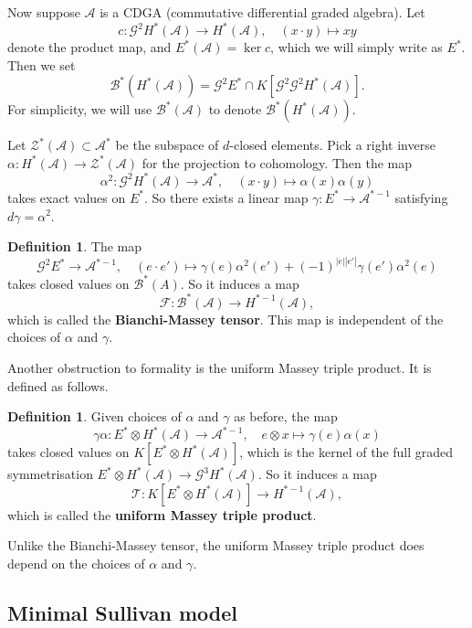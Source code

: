 \documentclass{article}
\theoremstyle{plain}
\theoremstyle{definition}
\newtheorem{defn}[thm]{Definition}
\theoremstyle{plain}
\numberwithin{equation}{section}
\begin{document}
Now suppose $\mathcal{A}$ is a CDGA (commutative differential graded algebra). Let
$$
c:\mathcal{G}^2H^*(\mathcal{A})\to H^*(\mathcal{A}), \quad (x\cdot y)\mapsto xy
$$
denote the product map, and $E^*(\mathcal{A})=\ker c$, which we will simply write as $E^*$. Then we set
$$
\mathcal{B}^*(H^*(\mathcal{A}))=\mathcal{G}^2E^*\cap K[\mathcal{G}^2\mathcal{G}^2H^*(\mathcal{A})].
$$
For simplicity, we will use $\mathcal{B}^*(\mathcal{A})$ to denote $\mathcal{B}^*(H^*(\mathcal{A}))$.

Let $\mathcal{Z}^*(\mathcal{A})\subset \mathcal{A}^*$ be the subspace of $d$-closed elements. Pick a right inverse $\alpha:H^*(\mathcal{A})\to \mathcal{Z}^*(\mathcal{A})$ for the projection to cohomology. Then the map
$$
\alpha^2:\mathcal{G}^2H^*(\mathcal{A})\to \mathcal{A}^*, \quad (x\cdot y)\mapsto \alpha(x)\alpha(y)
$$
takes exact values on $E^*$. So there exists a linear map $\gamma:E^*\to \mathcal{A}^{*-1}$ satisfying $d\gamma=\alpha^2$.

\begin{defn}
The map
$$
\mathcal{G}^2E^*\to \mathcal{A}^{*-1},\quad (e\cdot e')\mapsto \gamma(e)\alpha^2(e')+(-1)^{|e||e'|}\gamma(e')\alpha^2(e)
$$
takes closed values on $\mathcal{B}^*(A)$. So it induces a map
$$
\mathcal{F}:\mathcal{B}^*(\mathcal{A})\to H^{*-1}(\mathcal{A}),
$$
which is called the \textbf{Bianchi-Massey tensor}. This map is independent of the choices of $\alpha$ and $\gamma$.
\end{defn}

Another obstruction to formality is the uniform Massey triple product. It is defined as follows.
\begin{defn}\label{def of uniform Massey}
Given choices of $\alpha$ and $\gamma$ as before, the map
$$
\gamma\alpha:E^*\otimes H^*(\mathcal{A})\to \mathcal{A}^{*-1}, \quad e\otimes x\mapsto \gamma(e)\alpha(x)
$$
takes closed values on $K[E^*\otimes H^*(\mathcal{A})]$, which is the kernel of the full graded symmetrisation $E^*\otimes H^*(\mathcal{A})\to\mathcal{G}^3H^*(\mathcal{A})$. So it induces a map
$$
\mathcal{T}:K[E^*\otimes H^*(\mathcal{A})]\to H^{*-1}(\mathcal{A}),
$$
which is called the \textbf{uniform Massey triple product}.
\end{defn}

Unlike the Bianchi-Massey tensor, the uniform Massey triple product does depend on the choices of $\alpha$ and $\gamma$.



\subsection{Minimal Sullivan model}
\end{document}
